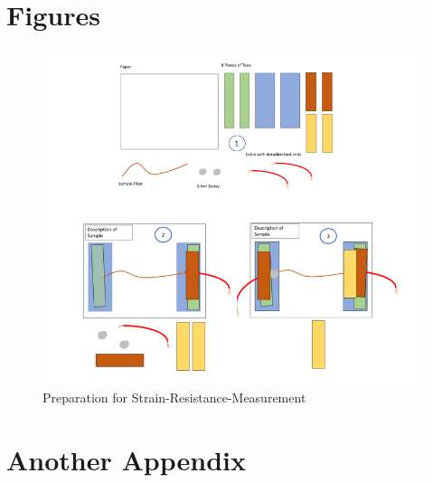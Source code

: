 \begin{appendices}[Appendix]

\label{sec:Appendix}

\section{Figures}
\label{appendix:fig}

\begin{figure}[hb!]
    \centering
    \includegraphics[width=.8\textwidth]{./pic/Meas_Prep_Together.PNG}
    \caption{Preparation for Strain-Resistance-Measurement}
    \label{fig:MeasPrep}
\end{figure}

\section{Another Appendix}


\end{appendices}
\clearpage
